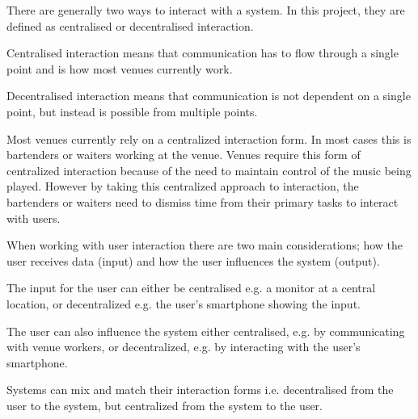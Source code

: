 There are generally two ways to interact with a system. In this project, they are defined as centralised or decentralised interaction.

Centralised interaction means that communication has to flow through a single point and is how most venues currently work.

Decentralised interaction means that communication is not dependent on a single point, but instead is possible from multiple points.

Most venues currently rely on a centralized interaction form. In most cases this is bartenders or waiters working at the venue. Venues require this form of centralized interaction because of the need to maintain control of the music being played. However by taking this centralized approach to interaction, the bartenders or waiters need to dismiss time from their primary tasks to interact with users.

When working with user interaction there are two main considerations; how the user receives data (input) and how the user influences the system (output).


The input for the user can either be centralised e.g. a monitor at a central location, or decentralized e.g. the user's smartphone showing the input.

The user can also influence the system either centralised, e.g. by communicating with venue workers, or decentralized, e.g. by interacting with the user's smartphone.

Systems can mix and match their interaction forms i.e. decentralised from the user to the system, but centralized from the system to the user.


